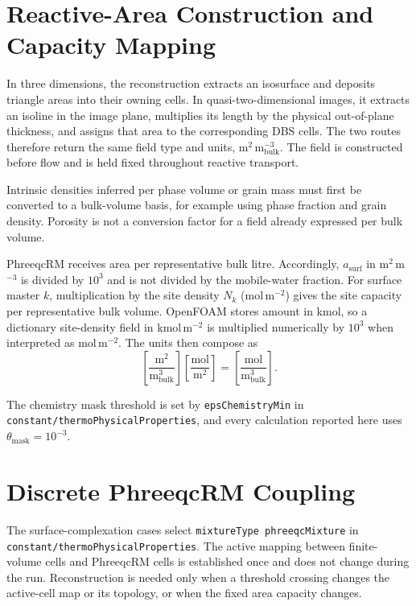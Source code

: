 \section{Reactive-Area Construction and Capacity Mapping}

In three dimensions, the reconstruction extracts an isosurface and deposits
triangle areas into their owning cells. In quasi-two-dimensional images, it
extracts an isoline in the image plane, multiplies its length by the physical
out-of-plane thickness, and assigns that area to the corresponding DBS cells.
The two routes therefore return the same field type and units,
m$^2$\,m$^{-3}_{\mathrm{bulk}}$. The field is constructed before flow and is
held fixed throughout reactive transport.

Intrinsic densities inferred per phase volume or grain mass must first be
converted to a bulk-volume basis, for example using phase fraction and grain
density. Porosity is not a conversion factor for a field already expressed per
bulk volume.

PhreeqcRM \citep{parkhurst2015phreeqcrm} receives area per representative bulk
litre. Accordingly,
$a_{\mathrm{surf}}$ in m$^2$\,m$^{-3}$ is divided by $10^3$ and is not divided
by the mobile-water fraction. For surface master $k$, multiplication by the
site density $N_k$ (mol\,m$^{-2}$) gives the site capacity per representative
bulk volume. OpenFOAM stores amount in kmol, so a dictionary site-density field
in kmol\,m$^{-2}$ is multiplied numerically by $10^3$ when interpreted as
mol\,m$^{-2}$. The units then compose as
\[
\left[\frac{\mathrm{m}^2}{\mathrm{m}^3_{\mathrm{bulk}}}\right]
\left[\frac{\mathrm{mol}}{\mathrm{m}^2}\right]
=\left[\frac{\mathrm{mol}}{\mathrm{m}^3_{\mathrm{bulk}}}\right].
\]

The chemistry mask threshold is set by \texttt{epsChemistryMin} in
\texttt{constant/thermoPhysicalProperties}, and every calculation reported here
uses $\theta_{\mathrm{mask}} = 10^{-3}$.

\section{Discrete PhreeqcRM Coupling}

The surface-complexation cases select \texttt{mixtureType phreeqcMixture} in
\texttt{constant/thermoPhysicalProperties}. The active mapping between
finite-volume cells and PhreeqcRM cells is established once and does not change
during the run. Reconstruction is needed only when a threshold crossing changes
the active-cell map or its topology, or when the fixed area capacity changes.

